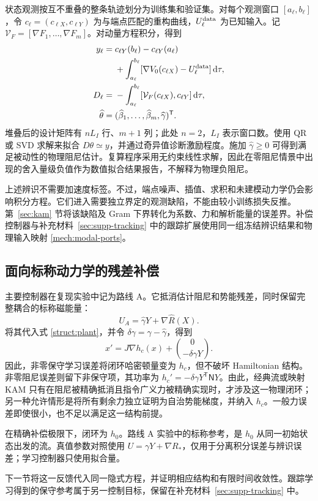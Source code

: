 状态观测按互不重叠的整条轨迹划分为训练集和验证集。对每个观测窗口 $[a_\ell,b_\ell]$，令 $c_\ell=(c_{\ell X},c_{\ell Y})$ 为与端点匹配的重构曲线，$U_\ell^{\rm data}$ 为已知输入。记 $\mathcal V_F=[\nabla F_1,\ldots,\nabla F_m]$。对动量方程积分，得到
\begin{equation}\label{struct:integral-design}
\begin{aligned}
 y_\ell={}&c_{\ell Y}(b_\ell)-c_{\ell Y}(a_\ell)\\
   &+\int_{a_\ell}^{b_\ell}
      [\nabla V_0(c_{\ell X})-U_\ell^{\rm data}]\,\mathrm d\tau,\\
 D_\ell={}&-\int_{a_\ell}^{b_\ell}
          [\mathcal V_F(c_{\ell X}),c_{\ell Y}]\,\mathrm d\tau,\\
 \widehat\theta={}&(\widehat\beta_1,\ldots,\widehat\beta_m,
                      \widehat\gamma)^{\mathsf T}.
\end{aligned}
\end{equation}
堆叠后的设计矩阵有 $nL_I$ 行、$m+1$ 列；此处 $n=2$，$L_I$ 表示窗口数。使用 QR 或 SVD 求解来拟合 $D\theta\simeq y$，并通过奇异值诊断激励程度。施加 $\widehat\gamma\ge0$ 可得到满足被动性的物理阻尼估计。复算程序采用无约束线性求解，因此在零阻尼情景中出现的舍入量级负值作为数值拟合结果报告，不解释为物理负阻尼。

上述辨识不需要加速度标签。不过，端点噪声、插值、求积和未建模动力学仍会影响积分方程。它们进入需要独立界定的观测缺陷，不能由较小训练损失反推。第~\ref{sec:kam} 节将该缺陷及 Gram 下界转化为系数、力和解析能量的误差界。补偿控制器与补充材料~\ref{sec:supp-tracking} 中的跟踪扩展使用同一组冻结辨识结果和物理输入映射 \eqref{mech:modal-ports}。

\subsection{面向标称动力学的残差补偿}
\label{struct:route-a-section}

主要控制器在复现实验中记为路线 A。它抵消估计阻尼和势能残差，同时保留完整耦合的标称磁能量：
\begin{equation}\label{struct:route-a-control}
 U_A=\widehat\gamma Y+\nabla\widehat R(X).
\end{equation}
将其代入式 \eqref{struct:plant}，并令 $\delta\gamma=\gamma-\widehat\gamma$，得到
\begin{equation}\label{struct:route-a-closed}
 x'=J\nabla h_c(x)+\binom{0}{-\delta\gamma Y}.
\end{equation}
因此，非零保守学习误差将闭环哈密顿量变为 $h_c$，但不破坏 Hamiltonian 结构。非零阻尼误差则留下非保守项，其功率为 $h_c'=-\delta\gamma Y^{\mathsf T}\mathsf N Y$。由此，经典流或映射 KAM 只有在阻尼被精确抵消且指令广义力被精确实现时，才涉及这一物理闭环；另一种允许情形是将所有剩余力独立证明为自治势能梯度，并纳入 $h_c$。一般力误差即使很小，也不足以满足这一结构前提。

在精确补偿极限下，闭环为 $h_0$。路线 A 实验中的标称参考，是 $h_0$ 从同一初始状态出发的流。真值参数对照使用 $U=\gamma Y+\nabla R_*$，仅用于分离积分误差与辨识误差；学习控制器只使用拟合量。


下一节将这一反馈代入同一隐式方程，并证明相应结构和有限时间收敛性。跟踪学习得到的保守参考属于另一控制目标，保留在补充材料~\ref{sec:supp-tracking} 中。
